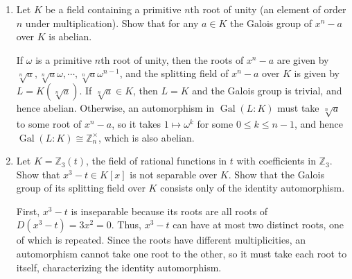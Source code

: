 \documentclass[12pt]{article}
\newcommand{\ZZ}{\mathbb{Z}}
\DeclareMathOperator{\Gal}{Gal}
\begin{document}
\begin{enumerate}
    \item
        Let $K$ be a field containing a primitive $n$th root of unity (an element of order $n$ under multiplication).  Show that for any $a \in K$ the Galois group of $x^n -a$ over $K$ is abelian. \par
        \sloppy
        If $\omega$ is a primitive $n$th root of unity, then the roots of $x^n - a$ are given by $\sqrt[n]{a}, \sqrt[n]{a}\omega, \cdots, \sqrt[n]{a}\omega^{n - 1}$, and the splitting field of $x^n - a$ over $K$ is given by $L = K(\sqrt[n]{a})$. If $\sqrt[n]{a} \in K$, then $L = K$ and the Galois group is trivial, and hence abelian. Otherwise, an automorphism in $\Gal(L : K)$ must take $\sqrt[n]{a}$ to some root of $x^n - a$, so it takes $1 \mapsto \omega^k$ for some $0 \leq k \leq n - 1$, and hence $\Gal(L : K) \cong \mathbb{Z}_n^\times$, which is also abelian.

    \item
        Let $K = \ZZ_3(t)$, the field of rational functions in $t$ with coefficients in $\ZZ_3$.  Show that $x^3 - t \in K[x]$ is not separable over $K$.  Show that the Galois group of its splitting field over $K$ consists only of the identity automorphism. \par
        First, $x^3 - t$ is inseparable because its roots are all roots of $D(x^3 - t) = 3x^2 = 0$. Thus, $x^3 - t$ can have at most two distinct roots, one of which is repeated. Since the roots have different multiplicities, an automorphism cannot take one root to the other, so it must take each root to itself, characterizing the identity automorphism.


\end{enumerate}
\end{document}
